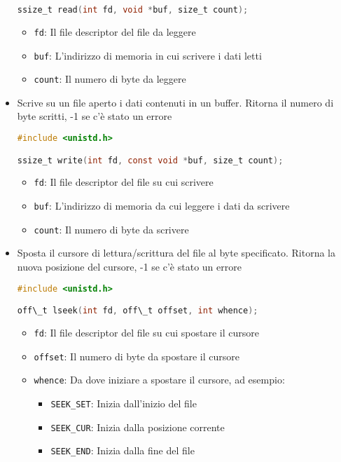 \documentclass[a4paper]{article}
\begin{document}
\begin{itemize}
\begin{lstlisting}[language=C]
ssize_t read(int fd, void *buf, size_t count);
\end{lstlisting}
  \begin{itemize}
    \item \texttt{fd}: Il file descriptor del file da leggere
    \item \texttt{buf}: L'indirizzo di memoria in cui scrivere i dati letti
    \item \texttt{count}: Il numero di byte da leggere
  \end{itemize}

\item Scrive su un file aperto i dati contenuti in un buffer. Ritorna il numero di
  byte scritti, -1 se c'è stato un errore
\begin{lstlisting}[language=C]
#include <unistd.h>

ssize_t write(int fd, const void *buf, size_t count);
\end{lstlisting}
  \begin{itemize}
    \item \texttt{fd}: Il file descriptor del file su cui scrivere
    \item \texttt{buf}: L'indirizzo di memoria da cui leggere i dati da scrivere
    \item \texttt{count}: Il numero di byte da scrivere
  \end{itemize}

\item Sposta il cursore di lettura/scrittura del file al byte specificato. Ritorna
  la nuova posizione del cursore, -1 se c'è stato un errore
\begin{lstlisting}[language=C]
#include <unistd.h>

off\_t lseek(int fd, off\_t offset, int whence);
\end{lstlisting}
  \begin{itemize}
    \item \texttt{fd}: Il file descriptor del file su cui spostare il cursore
    \item \texttt{offset}: Il numero di byte da spostare il cursore
    \item \texttt{whence}: Da dove iniziare a spostare il cursore, ad esempio:
      \begin{itemize}
        \item \texttt{SEEK\_SET}: Inizia dall'inizio del file
        \item \texttt{SEEK\_CUR}: Inizia dalla posizione corrente
        \item \texttt{SEEK\_END}: Inizia dalla fine del file
      \end{itemize}
  \end{itemize}


\end{itemize}
\end{document}

